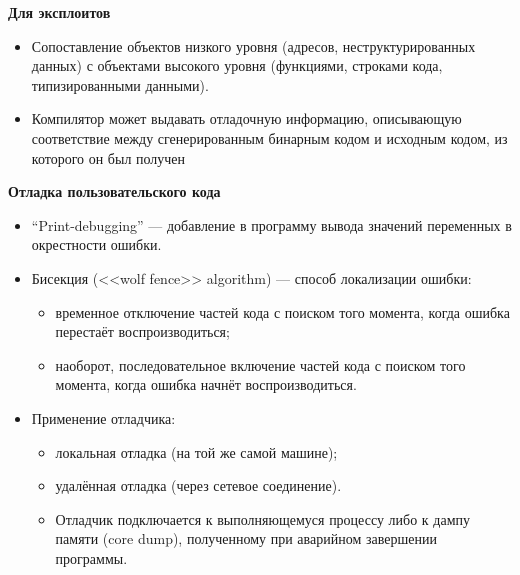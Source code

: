 
\textbf{Для эксплоитов}
\begin{itemize}
  \item Сопоставление объектов низкого уровня (адресов, неструктурированных данных) с объектами высокого уровня (функциями, строками кода, типизированными данными).
  \item Компилятор может выдавать отладочную информацию, описывающую соответствие между сгенерированным бинарным кодом и исходным кодом, из которого он был получен
\end{itemize}

\textbf{Отладка пользовательского кода}
\begin{itemize}
    \item “Print-debugging” — добавление в программу вывода значений переменных в окрестности ошибки.
    \item Бисекция (<<wolf fence>> algorithm) — способ локализации ошибки:
    \begin{itemize}
        \item временное отключение частей кода с поиском того момента, когда ошибка перестаёт воспроизводиться;
        \item наоборот, последовательное включение частей кода с поиском того момента, когда ошибка начнёт воспроизводиться.
    \end{itemize}
    \item  Применение отладчика:
    \begin{itemize}
        \item локальная отладка (на той же самой машине);
        \item удалённая отладка (через сетевое соединение).
        \item Отладчик подключается к выполняющемуся процессу либо к дампу памяти (core dump), полученному при аварийном завершении программы.
    \end{itemize}
\end{itemize}



